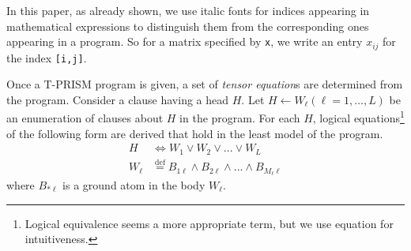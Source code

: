 \documentclass[a4paper]{report}
\newcommand{\mmat}[1]{\mathbf{#1}}
\newcommand{\defeq}{\ensuremath{\stackrel{\mathrm{def}}{=}}}
\newcommand{\tensor}{\mbox{\tt tensor}}
\newcommand{\indexfunc}{T}
\begin{document}
In  this paper,  as already  shown, we  use italic  fonts for  indices
appearing  in mathematical  expressions to  distinguish them  from the
corresponding ones appearing  in a program. So for  a matrix specified
by {\tt x}, we write an entry $x_{ij}$ for the index {\tt [i,j]}.



Once a T-PRISM program is given, a set of {\it tensor equation\/}s are
determined from the program. Consider a  clause having a head $H$. Let
$H  \leftarrow  W_{\ell}  (\ell  =1,\ldots,L)$ be  an  enumeration  of
clauses   about  $H$   in   the  program.   For   each  $H$,   logical
equations\footnote{
	Logical equivalence seems a more appropriate term, but we use equation
	for intuitiveness.
} of the following form are derived that hold in the least model of
the program.
%
\begin{align} \nonumber
H &\Leftrightarrow W_{1} \vee W_{2} \vee ... \vee W_{L} \\
W_{\ell} &\defeq B_{1\ell} \wedge B_{2\ell} \wedge ... \wedge B_{M_\ell \ell}
\label{eq:logic_eqs}
\end{align}
%
where $B_{*\ell}$ is a ground atom in the body $W_{\ell}$.
\end{document}
